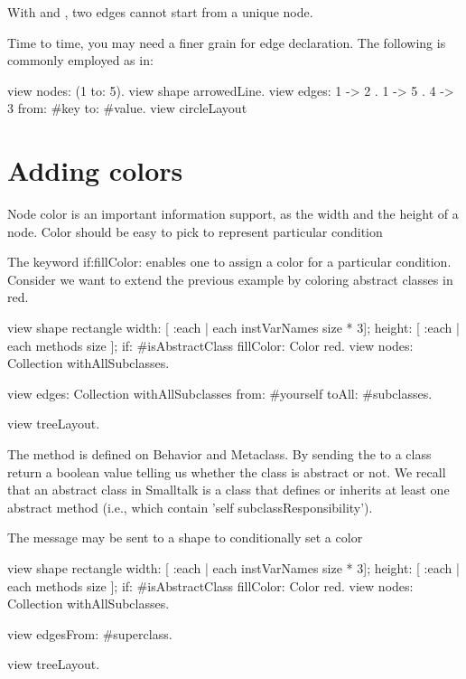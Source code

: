 \documentclass[a4paper,10pt,twoside]{book}
\begin{document}
With  and , two edges cannot start from a unique node.

Time to time, you may need a finer grain for edge declaration. The following is commonly employed as in:

\begin{code}{}
view nodes: (1 to: 5). 
view shape arrowedLine. 
view edges: { 1 -> 2 . 1 -> 5 . 4 -> 3 } from: #key to: #value. 
view circleLayout
\end{code}

\section{Adding colors}
Node color is an important information support, as the width and the height of a node. Color should be easy to pick to represent particular condition

The keyword if:fillColor: enables one to assign a color for a particular condition. Consider we want to extend the previous example by coloring abstract classes in red.

\begin{code}{}
view shape rectangle
  width: [ :each | each instVarNames size * 3];
  height: [ :each | each methods size ];
  if: #isAbstractClass fillColor: Color red.
view nodes: Collection withAllSubclasses.

view edges: Collection withAllSubclasses from: #yourself toAll: #subclasses.

view treeLayout.
\end{code}

The method  is defined on Behavior and Metaclass. By sending the  to a class return a boolean value telling us whether the class is abstract or not. We recall that an abstract class in Smalltalk is a class that defines or inherits at least one  abstract method (i.e., which contain 'self subclassResponsibility').

The message  may be sent to a shape to conditionally set a color

\begin{code}{}
view shape rectangle
  width: [ :each | each instVarNames size * 3];
  height: [ :each | each methods size ];
  if: #isAbstractClass fillColor: Color red.
view nodes: Collection withAllSubclasses.

view edgesFrom: #superclass.

view treeLayout.
\end{code}
\end{document}
